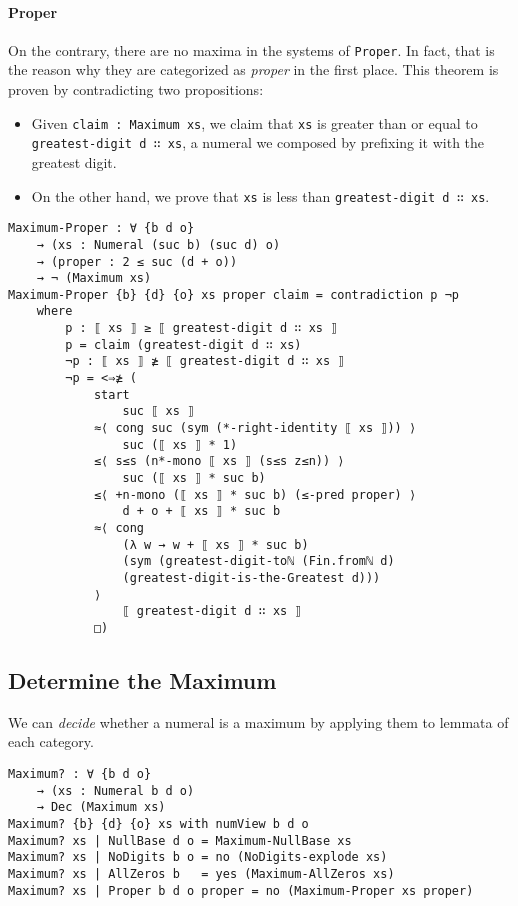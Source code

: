 \documentclass[\main/thesis.tex]{subfiles}
\begin{document}
\paragraph{Proper}

On the contrary, there are no maxima in the systems of {\lstinline|Proper|}.
In fact, that is the reason why they are categorized as \textit{proper} in the
first place. This theorem is proven by contradicting two propositions:

\begin{itemize}
    \item Given {\lstinline|claim : Maximum xs|}, we claim that {\lstinline|xs|}
        is greater than or equal to {\lstinline|greatest-digit d ∷ xs|}, a numeral
        we composed by prefixing it with the greatest digit.
    \item On the other hand, we prove that {\lstinline|xs|} is less than
        {\lstinline|greatest-digit d ∷ xs|}.
\end{itemize}

\begin{lstlisting}
Maximum-Proper : ∀ {b d o}
    → (xs : Numeral (suc b) (suc d) o)
    → (proper : 2 ≤ suc (d + o))
    → ¬ (Maximum xs)
Maximum-Proper {b} {d} {o} xs proper claim = contradiction p ¬p
    where
        p : ⟦ xs ⟧ ≥ ⟦ greatest-digit d ∷ xs ⟧
        p = claim (greatest-digit d ∷ xs)
        ¬p : ⟦ xs ⟧ ≱ ⟦ greatest-digit d ∷ xs ⟧
        ¬p = <⇒≱ (
            start
                suc ⟦ xs ⟧
            ≈⟨ cong suc (sym (*-right-identity ⟦ xs ⟧)) ⟩
                suc (⟦ xs ⟧ * 1)
            ≤⟨ s≤s (n*-mono ⟦ xs ⟧ (s≤s z≤n)) ⟩
                suc (⟦ xs ⟧ * suc b)
            ≤⟨ +n-mono (⟦ xs ⟧ * suc b) (≤-pred proper) ⟩
                d + o + ⟦ xs ⟧ * suc b
            ≈⟨ cong
                (λ w → w + ⟦ xs ⟧ * suc b)
                (sym (greatest-digit-toℕ (Fin.fromℕ d)
                (greatest-digit-is-the-Greatest d)))
            ⟩
                ⟦ greatest-digit d ∷ xs ⟧
            □)
\end{lstlisting}

\subsection{Determine the Maximum}

We can \textit{decide} whether a numeral is a maximum by applying them to
lemmata of each category.

\begin{lstlisting}
Maximum? : ∀ {b d o}
    → (xs : Numeral b d o)
    → Dec (Maximum xs)
Maximum? {b} {d} {o} xs with numView b d o
Maximum? xs | NullBase d o = Maximum-NullBase xs
Maximum? xs | NoDigits b o = no (NoDigits-explode xs)
Maximum? xs | AllZeros b   = yes (Maximum-AllZeros xs)
Maximum? xs | Proper b d o proper = no (Maximum-Proper xs proper)
\end{lstlisting}
\end{document}
